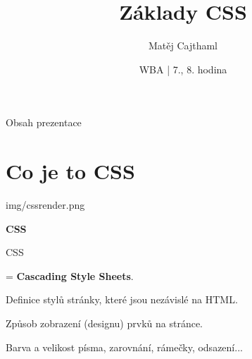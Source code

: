 \documentclass[aspectratio=169]{beamer}
\title{Základy CSS}
\date{WBA | 7., 8. hodina}
\author[Cajthaml]{Matěj Cajthaml}
\begin{document}
\begin{frame}
\titlepage
\end{frame}

\begin{frame}{Obsah prezentace}
    \begin{cardTiny}
        \begin{minipage}{\textwidth}
            \vspace{1ex}
            \tableofcontents
        \end{minipage}
    \end{cardTiny}
\end{frame}



\section{Co je to CSS}

\begin{frameImg}[width]{img/cssrender.png}
    \vspace*{60mm}
    \begin{cardTiny}
        \vspace*{\fill}
        \begin{center}
            \textbf{CSS}
        \end{center}
    \end{cardTiny}
\end{frameImg}

\begin{frame}{CSS}
    \begin{cardTiny}
        \begin{flushleft}
            = \textbf{Cascading Style Sheets}.

            Definice stylů stránky, které jsou nezávislé na HTML.

            Způsob zobrazení (designu) prvků na stránce.

            \vspace{2ex}
            Barva a velikost písma, zarovnání, rámečky, odsazení...
        \end{flushleft}
    \end{cardTiny}
\end{frame}
\end{document}
